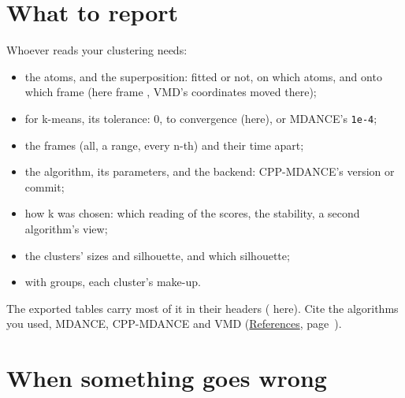 \documentclass[11pt,letterpaper]{article}
\newcommand{\file}[1]{\path{#1}}
\newcommand{\cmd}[1]{\texttt{#1}}
\begin{document}
\section{What to report}
\label{sec:report}

Whoever reads your clustering needs:

\begin{itemize}
  \item the atoms, and the superposition: fitted or not, on which atoms, and
    onto which frame (here frame \qsFitFrame, VMD's coordinates moved there);
  \item for k-means, its tolerance: 0, to convergence (here), or MDANCE's
    \cmd{1e-4};
  \item the frames (all, a range, every n-th) and their time apart;
  \item the algorithm, its parameters, and the backend: CPP-MDANCE's version or
    commit;
  \item how k was chosen: which reading of the scores, the stability, a second
    algorithm's view;
  \item the clusters' sizes and silhouette, and which silhouette;
  \item with groups, each cluster's make-up.
\end{itemize}

The exported tables carry most of it in their headers (\file{tau_summary.txt}
here). Cite the algorithms you used, MDANCE, CPP-MDANCE and VMD
(\hyperref[sec:references]{References}, page~\pageref{sec:references}).

\section{When something goes wrong}
\label{sec:problems}
\end{document}
